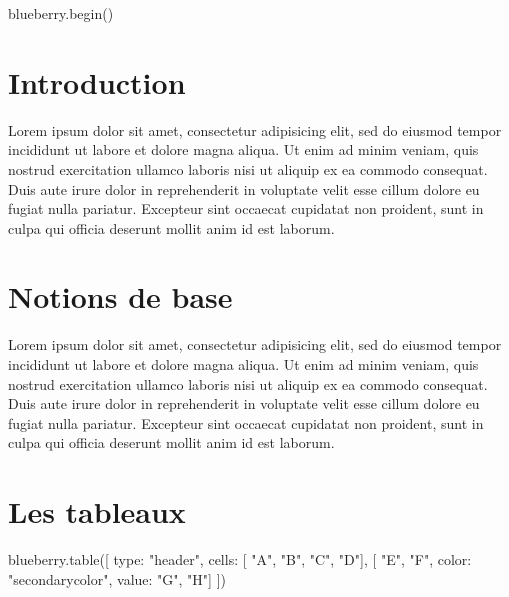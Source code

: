 \documentclass{assets/classes/blueberry}
\begin{document}
	{{ blueberry.begin() }}

	\section{Introduction}
		Lorem ipsum dolor sit amet, consectetur adipisicing elit, sed do eiusmod
		tempor incididunt ut labore et dolore magna aliqua. Ut enim ad minim veniam,
		quis nostrud exercitation ullamco laboris nisi ut aliquip ex ea commodo
		consequat. Duis aute irure dolor in reprehenderit in voluptate velit esse
		cillum dolore eu fugiat nulla pariatur. Excepteur sint occaecat cupidatat non
		proident, sunt in culpa qui officia deserunt mollit anim id est laborum.
	\section{Notions de base}
		Lorem ipsum dolor sit amet, consectetur adipisicing elit, sed do eiusmod
		tempor incididunt ut labore et dolore magna aliqua. Ut enim ad minim veniam,
		quis nostrud exercitation ullamco laboris nisi ut aliquip ex ea commodo
		consequat. Duis aute irure dolor in reprehenderit in voluptate velit esse
		cillum dolore eu fugiat nulla pariatur. Excepteur sint occaecat cupidatat non
		proident, sunt in culpa qui officia deserunt mollit anim id est laborum.

	\section{Les tableaux}

		{{blueberry.table([
 			{ type: "header", cells: [ "A", "B", "C", "D"]},
			[ "E", "F", {color: "secondarycolor", value: "G"}, "H"]
		])}}
\end{document}
